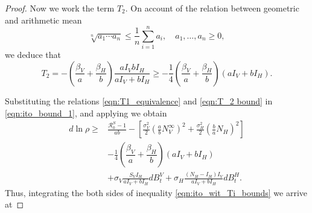 \begin{proof}
    Now we work the term $T_2$. On account of the relation between geometric
    and arithmetic mean
    $$
        \sqrt[n]{a_1  \cdots a_n}
        \leq
        \dfrac{1}{n}
        \sum_{i=1} ^ n
            a_i,
        \quad
        a_1,\dots, a_n \geq 0,
    $$
    we deduce that
    \begin{equation} \label{eqn:T_2 bound}
        T_2=
        -
        \left(
            \dfrac{\beta_V}{a}
            +
            \dfrac{\beta_H}{b}
        \right)
        \frac{
            a I_V b I_H
        }{
            aI_V + bI_H
        }
        \geq
        -\frac{1}{4}
        \left(
            \dfrac{\beta_V}{a}
            +
            \dfrac{\beta_H}{b}
        \right)
        \left(
            a I_V + b I_H
        \right) .
    \end{equation}

    Substituting the relations 
    \eqref{eqn:T1_equivalence} and \eqref{eqn:T_2 bound} in 
    \eqref{eqn:ito_bound_1}, and applying 
    we obtain
    \begin{equation} \label{eqn:ito_wit_Ti_bounds}
        \begin{aligned}
            d \ln \rho
            \geq &
            \frac{
                \mathcal{R}_0 ^ S - 1
            }{
                a b
            }
            -
            \left[
                \frac{\sigma_V ^ 2}{2}
                \left(
                    \frac{a}{b} N_V ^ \infty
                \right) ^2
                +
                \frac{\sigma_H ^ 2}{2}
                \left(
                    \frac{b}{a}
                    N_H
                \right) ^ 2
            \right]
            \\
            &
            -\frac{1}{4}
            \left(
                \dfrac{\beta_V}{a}
                +
                \dfrac{\beta_H}{b}
            \right)
            \left(
                a I_V + b I_H
            \right)
            \\
            & +
            \sigma_V 
            \frac{S_V I_H}{a I_V + b I_H}
            d B_t ^ V
            +
            \sigma_H 
            \frac{(N_H - I_H) I_V}{a I_V + b I_H}
            d B_t ^ H .
        \end{aligned}
    \end{equation}
    Thus, integrating the both sides of inequality 
    \eqref{eqn:ito_wit_Ti_bounds} we arrive at
\end{proof}
